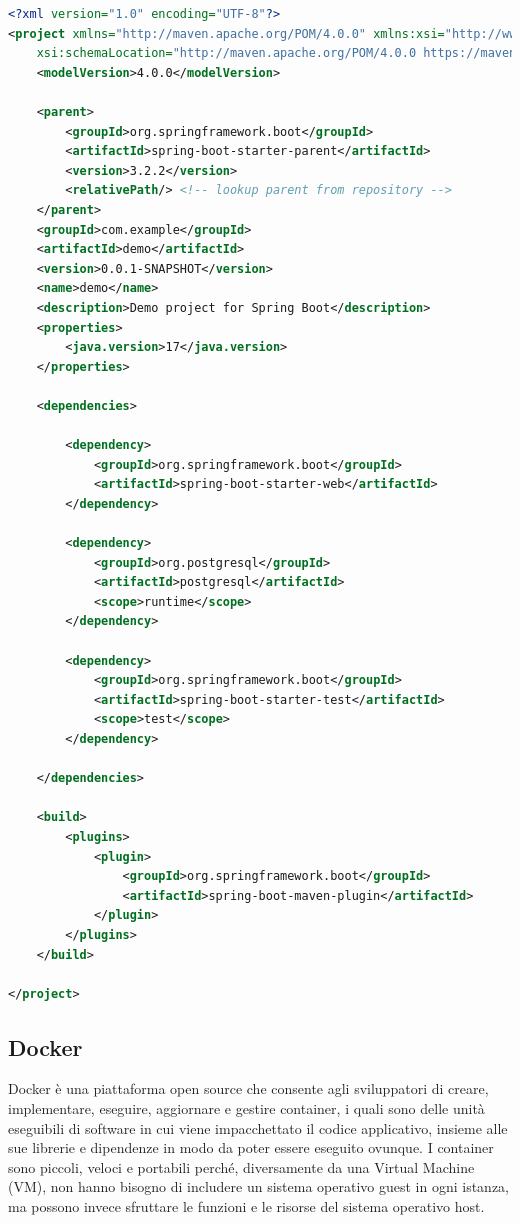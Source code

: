 \begin{lstlisting}[language = xml,  basicstyle=\tiny, caption={Esempio di pom.xml, nel quale sono state aggiunte le dipendenze web e database.}, captionpos=b]
<?xml version="1.0" encoding="UTF-8"?>
<project xmlns="http://maven.apache.org/POM/4.0.0" xmlns:xsi="http://www.w3.org/2001/XMLSchema-instance"
	xsi:schemaLocation="http://maven.apache.org/POM/4.0.0 https://maven.apache.org/xsd/maven-4.0.0.xsd">
	<modelVersion>4.0.0</modelVersion>
	
	<parent>
		<groupId>org.springframework.boot</groupId>
		<artifactId>spring-boot-starter-parent</artifactId>
		<version>3.2.2</version>
		<relativePath/> <!-- lookup parent from repository -->
	</parent>
	<groupId>com.example</groupId>
	<artifactId>demo</artifactId>
	<version>0.0.1-SNAPSHOT</version>
	<name>demo</name>
	<description>Demo project for Spring Boot</description>
	<properties>
		<java.version>17</java.version>
	</properties>
	
	<dependencies>
		
		<dependency>
			<groupId>org.springframework.boot</groupId>
			<artifactId>spring-boot-starter-web</artifactId>
		</dependency>

		<dependency>
			<groupId>org.postgresql</groupId>
			<artifactId>postgresql</artifactId>
			<scope>runtime</scope>
		</dependency>
		
		<dependency>
			<groupId>org.springframework.boot</groupId>
			<artifactId>spring-boot-starter-test</artifactId>
			<scope>test</scope>
		</dependency>
		
	</dependencies>

	<build>
		<plugins>
			<plugin>
				<groupId>org.springframework.boot</groupId>
				<artifactId>spring-boot-maven-plugin</artifactId>
			</plugin>
		</plugins>
	</build>

</project>

\end{lstlisting}

\newpage

\subsection{Docker}
Docker è una piattaforma open source che consente agli sviluppatori di creare, implementare, eseguire, aggiornare e gestire container, i quali sono delle unità eseguibili di software in cui viene impacchettato il codice applicativo, insieme alle sue librerie e dipendenze in modo da poter essere eseguito ovunque.
I container sono piccoli, veloci e portabili perché, diversamente da una Virtual Machine (VM), non hanno bisogno di includere un sistema operativo guest in ogni istanza, ma possono invece sfruttare le funzioni e le risorse del sistema operativo host. \cite{docker}
